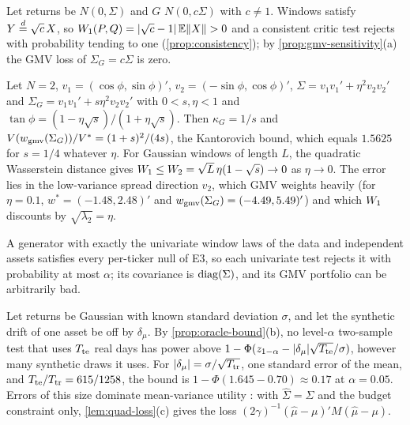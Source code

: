 \begin{example}\label{ex:scale-blind}
Let returns be \iid{} $N(0,\Sigma)$ and $G$ \iid{} $N(0,c\Sigma)$ with $c\neq1$. Windows satisfy
$Y\overset{d}{=}\sqrt c\,X$, so $W_{1}(P,Q)=\lvert\sqrt c-1\rvert\,\mathbb{E}\lVert X\rVert>0$ and a consistent critic test rejects
with probability tending to one (\cref{prop:consistency}); by \cref{prop:gmv-sensitivity}(a) the
GMV loss of $\Sigma_G=c\Sigma$ is zero.
\end{example}

\begin{example}\label{ex:spread}
Let $N=2$, $v_1=(\cos\phi,\sin\phi)'$, $v_2=(-\sin\phi,\cos\phi)'$, $\Sigma=v_1v_1'+\eta^2v_2v_2'$
and $\Sigma_G=v_1v_1'+s\eta^2v_2v_2'$ with $0<s,\eta<1$ and
$\tan\phi=(1-\eta\sqrt s)/(1+\eta\sqrt s)$. Then $\kappa_G=1/s$ and
$V(w_{\mathrm{gmv}}(\Sigma_G))/V^*=(1+s)^2/(4s)$, the Kantorovich bound, which equals $1.5625$ for $s=1/4$
whatever $\eta$. For \iid{} Gaussian windows of length $L$, the quadratic Wasserstein distance
gives $W_{1}\le W_2=\sqrt L\,\eta(1-\sqrt s)\to0$ as $\eta\to0$. The error lies in the low-variance
spread direction $v_2$, which GMV weights heavily (for $\eta=0.1$, $w^*=(-1.48,2.48)'$ and
$w_{\mathrm{gmv}}(\Sigma_G)=(-4.49,5.49)'$) and which $W_{1}$ discounts by $\sqrt{\lambda_2}=\eta$.
\end{example}

\begin{example}\label{ex:corr-blind}
A generator with exactly the univariate window laws of the data and independent assets satisfies
every per-ticker null of E3, so each univariate test rejects it with probability at most $\alpha$;
its covariance is $\operatorname{diag}(\Sigma)$, and its GMV portfolio can be arbitrarily bad.
\end{example}

\begin{example}\label{ex:drift}
Let returns be \iid{} Gaussian with known standard deviation $\sigma$, and let the synthetic drift
of one asset be off by $\delta_\mu$. By \cref{prop:oracle-bound}(b), no level-$\alpha$ two-sample
test that uses $T_{\mathrm{te}}$ real days has power above
$1-\Phi(z_{1-\alpha}-\lvert\delta_\mu\rvert\sqrt{T_{\mathrm{te}}}/\sigma)$, however many synthetic draws it uses.
For $\lvert\delta_\mu\rvert=\sigma/\sqrt{T_{\mathrm{tr}}}$, one standard error of the
\TRAIN{} mean, and $T_{\mathrm{te}}/T_{\mathrm{tr}}=615/1258$, the bound is $1-\Phi(1.645-0.70)\approx0.17$ at
$\alpha=0.05$. Errors of this size dominate mean-variance utility
\citep{michaud1989markowitz,chopra1993effect}: with $\hat\Sigma=\Sigma$ and the budget constraint
only, \cref{lem:quad-loss}(c) gives the loss $(2\gamma)^{-1}(\hat\mu-\mu)'M(\hat\mu-\mu)$.
\end{example}

